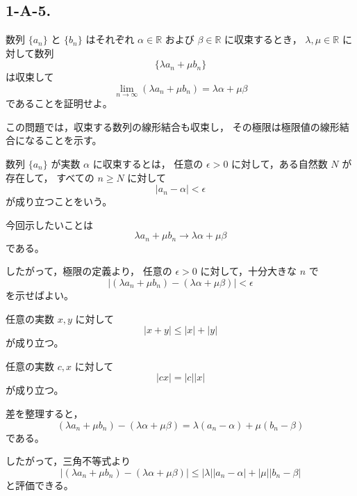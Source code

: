 \subsection{1-A-5.}
\begin{exercise}
	数列 $\{a_n\}$ と $\{b_n\}$ はそれぞれ
	$\alpha\in\mathbb{R}$ および $\beta\in\mathbb{R}$ に収束するとき，
	$\lambda,\mu\in\mathbb{R}$ に対して数列
	\[
		\{\lambda a_n+\mu b_n\}
	\]
	は収束して
	\[
		\lim_{n\to\infty}(\lambda a_n+\mu b_n)
		=
		\lambda\alpha+\mu\beta
	\]
	であることを証明せよ。
\end{exercise}
\begin{background}
	この問題では，収束する数列の線形結合も収束し，
	その極限は極限値の線形結合になることを示す。

	\begin{definition}[数列の収束]
		数列 $\{a_n\}$ が実数 $\alpha$ に収束するとは，
		任意の $\epsilon>0$ に対して，ある自然数 $N$ が存在して，
		すべての $n\geq N$ に対して
		\[
			|a_n-\alpha|<\epsilon
		\]
		が成り立つことをいう。
	\end{definition}

	\begin{remark}
		今回示したいことは
		\[
			\lambda a_n+\mu b_n
			\to
			\lambda\alpha+\mu\beta
		\]
		である。

		したがって，極限の定義より，
		任意の $\epsilon>0$ に対して，十分大きな $n$ で
		\[
			|(\lambda a_n+\mu b_n)-(\lambda\alpha+\mu\beta)|<\epsilon
		\]
		を示せばよい。
	\end{remark}

	\begin{lemma}[三角不等式]
		任意の実数 $x,y$ に対して
		\[
			|x+y|\leq |x|+|y|
		\]
		が成り立つ。
	\end{lemma}

	\begin{lemma}[定数倍と絶対値]
		任意の実数 $c,x$ に対して
		\[
			|cx|=|c||x|
		\]
		が成り立つ。
	\end{lemma}

	\begin{remark}
		差を整理すると，
		\[
			(\lambda a_n+\mu b_n)-(\lambda\alpha+\mu\beta)
			=
			\lambda(a_n-\alpha)+\mu(b_n-\beta)
		\]
		である。

		したがって，三角不等式より
		\[
			|(\lambda a_n+\mu b_n)-(\lambda\alpha+\mu\beta)|
			\leq
			|\lambda||a_n-\alpha|
			+
			|\mu||b_n-\beta|
		\]
		と評価できる。
	\end{remark}
\end{background}
